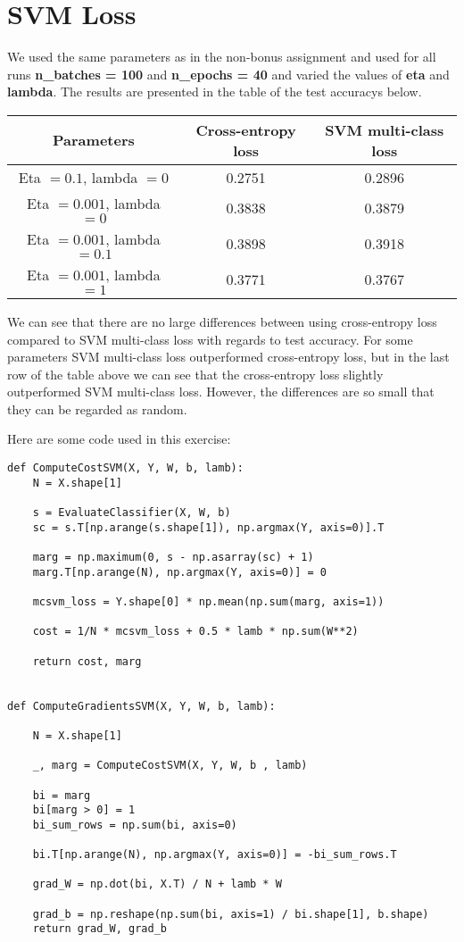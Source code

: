 \documentclass{article}
\begin{document}
\section{SVM Loss}


We used the same parameters as in the non-bonus assignment and used for all runs \textbf{n\_batches = 100} and 
\textbf{n\_epochs = 40} and varied the values of \textbf{eta} and \textbf{lambda}. 
The results are presented in the table of the test accuracys below. 

\begin{center}
\begin{tabular}{ |c|c|c| } 
\hline
Parameters  &  Cross-entropy loss & SVM multi-class loss  \\
\hline
 Eta $= 0.1$, lambda $= 0$ & 0.2751 & 0.2896 \\
\hline
Eta $= 0.001$, lambda $= 0$  & 0.3838 &  0.3879 \\ 
\hline
Eta $= 0.001$, lambda $= 0.1$   & 0.3898 &  0.3918  \\ 
\hline
Eta $= 0.001$, lambda $= 1$  & 0.3771  &  0.3767  \\ 
\hline 
\end{tabular}
\end{center}

We can see that there are no large differences between using cross-entropy loss 
compared to SVM multi-class loss with regards to test accuracy.
For some parameters SVM multi-class loss outperformed cross-entropy loss, but in the last row of the table above we can 
see that the cross-entropy loss slightly outperformed SVM multi-class loss. However, the differences are so small that they 
can be regarded as random. 

Here are some code used in this exercise:


\begin{lstlisting}
def ComputeCostSVM(X, Y, W, b, lamb):
	N = X.shape[1]

	s = EvaluateClassifier(X, W, b)
	sc = s.T[np.arange(s.shape[1]), np.argmax(Y, axis=0)].T

	marg = np.maximum(0, s - np.asarray(sc) + 1)
	marg.T[np.arange(N), np.argmax(Y, axis=0)] = 0

	mcsvm_loss = Y.shape[0] * np.mean(np.sum(marg, axis=1))

	cost = 1/N * mcsvm_loss + 0.5 * lamb * np.sum(W**2)

	return cost, marg


def ComputeGradientsSVM(X, Y, W, b, lamb):

	N = X.shape[1]

	_, marg = ComputeCostSVM(X, Y, W, b , lamb)

	bi = marg
	bi[marg > 0] = 1
	bi_sum_rows = np.sum(bi, axis=0)

	bi.T[np.arange(N), np.argmax(Y, axis=0)] = -bi_sum_rows.T

	grad_W = np.dot(bi, X.T) / N + lamb * W

	grad_b = np.reshape(np.sum(bi, axis=1) / bi.shape[1], b.shape)
	return grad_W, grad_b
\end{lstlisting}
\end{document}
